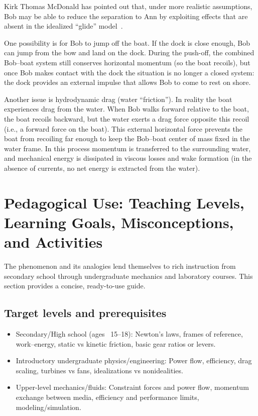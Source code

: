\documentclass[reprint,aps,pra,longbibliography]{revtex4-2}
\begin{document}
Kirk Thomas McDonald has pointed out that, under more realistic assumptions,
Bob may be able to reduce the separation to Ann by exploiting effects that are
absent in the idealized ``glide'' model~\cite{McDonald2026priv}.

One possibility is for Bob to jump off the boat. If the dock is close enough,
Bob can jump from the bow and land on the dock. During the push-off, the
combined Bob--boat system still conserves horizontal momentum (so the boat
recoils), but once Bob makes contact with the dock the situation is no longer a
closed system: the dock provides an external impulse that allows Bob to come to
rest on shore.

Another issue is hydrodynamic drag (water ``friction''). In reality the boat
experiences drag from the water. When Bob walks forward relative to the boat,
the boat recoils backward, but the water exerts a drag force opposite this
recoil (i.e., a forward force on the boat). This external horizontal force
prevents the boat from recoiling far enough to keep the Bob--boat center of
mass fixed in the water frame. In this process momentum is transferred to the
surrounding water, and mechanical energy is dissipated in viscous losses and
wake formation (in the absence of currents, no net energy is extracted from the
water).


\section{Pedagogical Use: Teaching Levels, Learning Goals, Misconceptions, and Activities}
\label{sec:pedagogy}

The phenomenon and its analogies lend themselves to rich instruction from secondary school through undergraduate mechanics and laboratory courses. This section provides a concise, ready-to-use guide.

\subsection{Target levels and prerequisites}

\begin{itemize}
\item Secondary/High school (ages ~15--18): Newton's laws, frames of reference, work--energy, static vs kinetic friction, basic gear ratios or levers.
\item Introductory undergraduate physics/engineering: Power flow, efficiency, drag scaling, turbines vs fans, idealizations vs nonidealities.
\item Upper-level mechanics/fluids: Constraint forces and power flow, momentum exchange between media, efficiency and performance limits, modeling/simulation.
\end{itemize}
\end{document}
